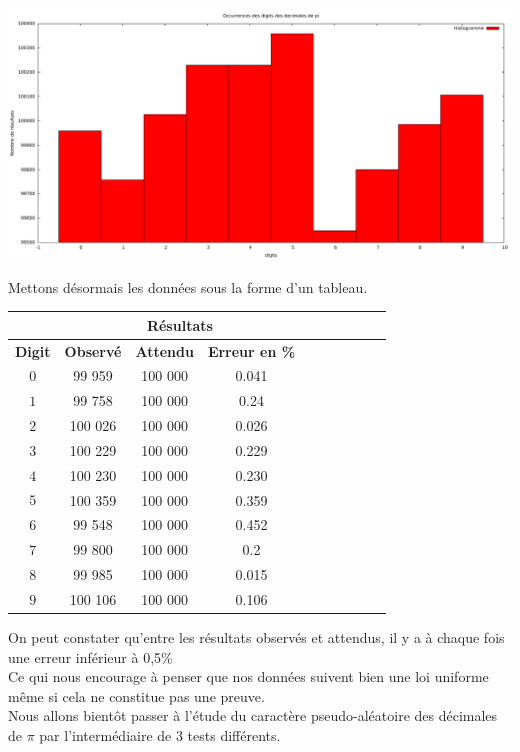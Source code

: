 \documentclass[french]{article}
\begin{document}
\begin{center}
	\includegraphics[scale=0.30]{Archives/Images/histo_zoom}
\end{center}

Mettons désormais les données sous la forme d'un tableau.

\begin{longtable}{|c|c|c|c|c|c|c|c|c|c|}
	\hline
	& \multicolumn{3}{c|}{\textbf{Résultats}} \\ 
	\hline 
	\textbf{Digit}  & \textbf{Observé} & \textbf{Attendu} & \textbf{Erreur en \%} \\ 
	\hline 
	$$0$$ & 99 959 & 100 000 & 0.041\\ 
	\hline 
	$$1$$ & 99 758 & 100 000 & 0.24\\ 
	\hline 
	$$2$$ & 100 026 & 100 000 & 0.026 \\ 
	\hline 
	$$3$$ & 100 229 & 100 000 & 0.229\\ 
	\hline 
	$$4$$ & 100 230 & 100 000 & 0.230\\ 
	\hline 
	$$5$$ & 100 359 & 100 000 & 0.359\\ 
	\hline 
	$$6$$ & 99 548 & 100 000 & 0.452\\ 
	\hline 
	$$7$$ & 99 800 & 100 000 & 0.2\\ 
	\hline 
	$$8$$ & 99 985 & 100 000 & 0.015\\ 
	\hline 
	$$9$$ & 100 106 & 100 000 & 0.106\\ 
	\hline
\end{longtable}

On peut constater qu'entre les résultats observés et attendus, il y a à chaque fois une
erreur inférieur à 0,5\%
\\
Ce qui nous encourage à penser que nos données suivent bien une loi uniforme même si cela ne 
constitue pas une preuve.
\\
Nous allons bientôt passer à l'étude du caractère pseudo-aléatoire des décimales de $\pi$
par l'intermédiaire de 3 tests différents.
\\
\end{document}

